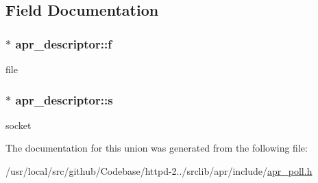 \subsection{Field Documentation}
\subsubsection[{\texorpdfstring{f}{f}}]{$\ast$ apr\+\_\+descriptor\+::f}\hypertarget{unionapr__descriptor_a69d605f2bb33b05ceedb3d95b744ca7e}{}\label{unionapr__descriptor_a69d605f2bb33b05ceedb3d95b744ca7e}
file 
\subsubsection[{\texorpdfstring{s}{s}}]{$\ast$ apr\+\_\+descriptor\+::s}\hypertarget{unionapr__descriptor_a39a15be8be084afadfa173810b346f6c}{}\label{unionapr__descriptor_a39a15be8be084afadfa173810b346f6c}
socket 

The documentation for this union was generated from the following file\+:\begin{DoxyCompactItemize}
\item 
/usr/local/src/github/\+Codebase/httpd-\/2../srclib/apr/include/\hyperlink{apr__poll_8h}{apr\+\_\+poll.\+h}\end{DoxyCompactItemize}
